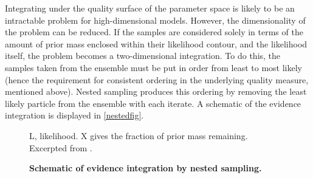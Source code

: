 Integrating under the quality surface of the parameter space is likely to be an intractable problem for high-dimensional models. However, the dimensionality of the problem can be reduced. If the samples are considered solely in terms of the amount of prior mass enclosed within their likelihood contour, and the likelihood itself, the problem becomes a two-dimensional integration. To do this, the samples taken from the ensemble must be put in order from least to most likely (hence the requirement for consistent ordering in the underlying quality measure, mentioned above). Nested sampling produces this ordering by removing the least likely particle from the ensemble with each iterate. A schematic of the evidence integration is displayed in \autoref{nestedfig}.

\begin{figure}[!h]
    \caption{{\bf Schematic of evidence integration by nested sampling.}} L, likelihood. X gives the fraction of prior mass remaining. Excerpted from \cite{Skilling2006}.
    \label{nestedfig}
\end{figure}

